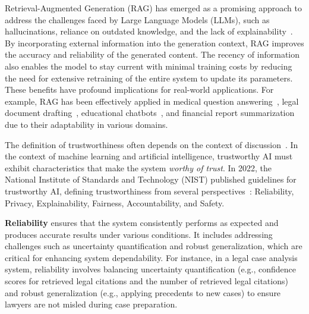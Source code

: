 Retrieval-Augmented Generation (RAG) has emerged as a promising approach to
address the challenges faced by Large Language Models (LLMs), such as
hallucinations, reliance on outdated knowledge, and the lack of explainability~\cite{Gao2023Retrieval, Zhang2023Sirens}. By incorporating external information into the generation context, RAG improves the accuracy and reliability of the generated content. The recency of information also enables the model to stay current with minimal training costs by reducing the need for extensive retraining of the entire system to update its parameters. These benefits have profound implications for
real-world applications. For example, RAG has been effectively applied in
medical question answering~\cite{xiong2024benchmarkingretrievalaugmentedgenerationmedicine, Zakka2023Almanac, singhal2023expertlevelmedicalquestionanswering}, legal
document drafting~\cite{Wiratunga2023CBR, pipitone2024legalbenchragbenchmarkretrievalaugmentedgeneration}, educational
chatbots~\cite{Thway2023Battling}, and financial report summarization~\cite{yepes2024financialreportchunkingeffective} due to their adaptability in various domains. 

The definition of trustworthiness often depends on the context of discussion~\cite{trustworthy_ai_computational_perspective_2021, survey_trustworthy_ai_meta_decision_2023, trustworthy_ai_acm_2023, global_study_trust_ai_2023, trustworthy_gnn_2023, liu2024machine, trustworthy_graph_neural_networks_2024, trustworthy_llms_2024}. In the context of machine learning and artificial intelligence, trustworthy AI must exhibit characteristics that make the system \textit{worthy of trust}. In 2022, the National Institute of Standards and Technology (NIST) published guidelines for trustworthy AI, defining trustworthiness from several perspectives~\cite{nist_trustworthy_ai}: Reliability, Privacy, Explainability, Fairness, Accountability, and Safety. 

\textbf{Reliability} ensures that the system consistently performs as expected and produces accurate results under various conditions. It includes addressing challenges such as uncertainty quantification and robust generalization, which are critical for enhancing system dependability. For instance, in a legal case analysis system, reliability involves balancing uncertainty quantification (e.g., confidence scores for retrieved legal citations and the number of retrieved legal citations) and robust generalization (e.g., applying precedents to new cases) to ensure lawyers are not misled during case preparation.

